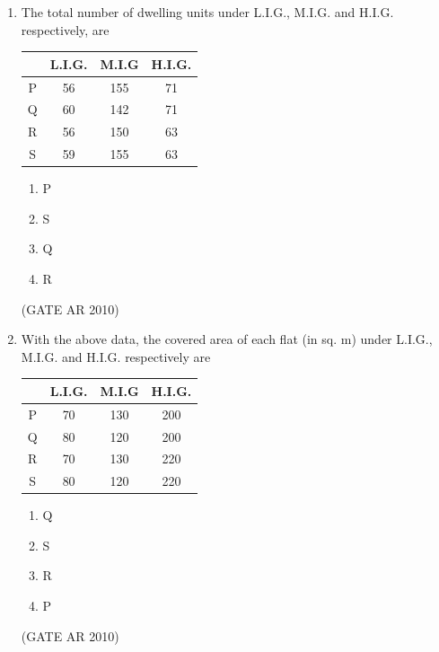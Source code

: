 \documentclass[journal]{IEEEtran}
\begin{document}
\begin{enumerate}
\item The total number of dwelling units under L.I.G., M.I.G. and H.I.G. respectively, are

\begin{table}[H]
\centering
\begin{tabular}{|c|c|c|c|}
\hline
& L.I.G. & M.I.G & H.I.G. \\
\hline
P & 56 & 155 & 71 \\
\hline
Q & 60 & 142 & 71 \\
\hline
R & 56 & 150 & 63 \\
\hline
S & 59 & 155 & 63 \\
\hline
\end{tabular}
\end{table}

\begin{multicols}{4}
\begin{enumerate}
\item P
\item S
\item Q
\item R
\end{enumerate}
\end{multicols}
\hfill (GATE AR 2010)

\item With the above data, the covered area of each flat (in sq. m) under L.I.G., M.I.G. and H.I.G. respectively are

\begin{table}[H]
\centering
\begin{tabular}{|c|c|c|c|}
\hline
& L.I.G. & M.I.G & H.I.G. \\
\hline
P & 70 & 130 & 200 \\
\hline
Q & 80 & 120 & 200 \\
\hline
R & 70 & 130 & 220 \\
\hline
S & 80 & 120 & 220 \\
\hline
\end{tabular}
\end{table}

\begin{multicols}{4}
\begin{enumerate}
\item Q
\item S
\item R
\item P
\end{enumerate}
\end{multicols}
\hfill (GATE AR 2010)


\end{enumerate}
\end{document}
